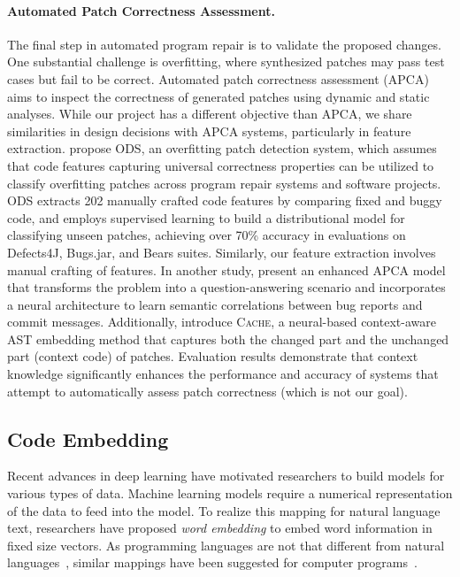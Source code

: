\paragraph{Automated Patch Correctness Assessment.}
The final step in automated program repair is to validate the proposed changes. One substantial challenge is overfitting, where synthesized patches may pass test cases but fail to be correct. Automated patch correctness assessment (APCA) aims to inspect the correctness of generated patches using dynamic and static analyses. While our project has a different objective than APCA, we share similarities in design decisions with APCA systems, particularly in feature extraction. \cite{ye2021automated} propose ODS, an overfitting patch detection system, which assumes that code features capturing universal correctness properties can be utilized to classify overfitting patches across program repair systems and software projects. ODS extracts 202 manually crafted code features by comparing fixed and buggy code, and employs supervised learning to build a distributional model for classifying unseen patches, achieving over 70\% accuracy in evaluations on Defects4J, Bugs.jar, and Bears suites. Similarly, our feature extraction involves manual crafting of features. In another study, \cite{tian2022change} present an enhanced APCA model that transforms the problem into a question-answering scenario and incorporates a neural architecture to learn semantic correlations between bug reports and commit messages. Additionally, \cite{lin2022context} introduce \textsc{Cache}, a neural-based context-aware AST embedding method that captures both the changed part and the unchanged part (context code) of patches. Evaluation results demonstrate that context knowledge significantly enhances the performance and accuracy of systems that attempt to automatically assess patch correctness (which is not our goal).


\subsection{Code Embedding}

Recent advances in deep learning have motivated researchers to build models for various types of data. Machine learning models require a numerical representation of the data to feed into the model. To realize this mapping for natural language text, researchers have proposed \emph{word embedding} to embed word information in fixed size vectors. As programming languages are not that different from natural languages~\citep{hindle2016naturalness}, similar mappings have been suggested for computer programs~\citep{chen2019literature}.

